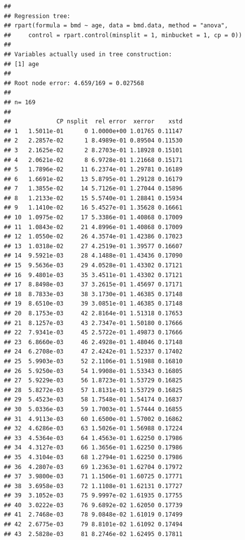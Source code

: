 \documentclass[
]{book}
\begin{document}
\begin{verbatim}
## 
## Regression tree:
## rpart(formula = bmd ~ age, data = bmd.data, method = "anova", 
##     control = rpart.control(minsplit = 1, minbucket = 1, cp = 0))
## 
## Variables actually used in tree construction:
## [1] age
## 
## Root node error: 4.659/169 = 0.027568
## 
## n= 169 
## 
##             CP nsplit  rel error  xerror    xstd
## 1   1.5011e-01      0 1.0000e+00 1.01765 0.11147
## 2   2.2857e-02      1 8.4989e-01 0.89504 0.11530
## 3   2.1625e-02      2 8.2703e-01 1.18928 0.15101
## 4   2.0621e-02      8 6.9728e-01 1.21668 0.15171
## 5   1.7896e-02     11 6.2374e-01 1.29781 0.16189
## 6   1.6691e-02     13 5.8795e-01 1.29128 0.16179
## 7   1.3855e-02     14 5.7126e-01 1.27044 0.15896
## 8   1.2133e-02     15 5.5740e-01 1.28841 0.15934
## 9   1.1410e-02     16 5.4527e-01 1.35628 0.16661
## 10  1.0975e-02     17 5.3386e-01 1.40868 0.17009
## 11  1.0843e-02     21 4.8996e-01 1.40868 0.17009
## 12  1.0550e-02     26 4.3574e-01 1.42386 0.17023
## 13  1.0318e-02     27 4.2519e-01 1.39577 0.16607
## 14  9.5921e-03     28 4.1488e-01 1.43436 0.17090
## 15  9.5636e-03     29 4.0528e-01 1.43302 0.17121
## 16  9.4801e-03     35 3.4511e-01 1.43302 0.17121
## 17  8.8498e-03     37 3.2615e-01 1.45697 0.17171
## 18  8.7833e-03     38 3.1730e-01 1.46385 0.17148
## 19  8.6510e-03     39 3.0851e-01 1.46385 0.17148
## 20  8.1753e-03     42 2.8164e-01 1.51318 0.17653
## 21  8.1257e-03     43 2.7347e-01 1.50180 0.17666
## 22  7.9341e-03     45 2.5722e-01 1.49873 0.17666
## 23  6.8660e-03     46 2.4928e-01 1.48046 0.17148
## 24  6.2708e-03     47 2.4242e-01 1.52337 0.17402
## 25  5.9903e-03     52 2.1106e-01 1.51988 0.16810
## 26  5.9250e-03     54 1.9908e-01 1.53343 0.16805
## 27  5.9229e-03     56 1.8723e-01 1.53729 0.16825
## 28  5.8272e-03     57 1.8131e-01 1.53729 0.16825
## 29  5.4523e-03     58 1.7548e-01 1.54174 0.16837
## 30  5.0336e-03     59 1.7003e-01 1.57444 0.16855
## 31  4.9113e-03     60 1.6500e-01 1.57002 0.16862
## 32  4.6286e-03     63 1.5026e-01 1.56988 0.17224
## 33  4.5364e-03     64 1.4563e-01 1.62250 0.17986
## 34  4.3127e-03     66 1.3656e-01 1.62250 0.17986
## 35  4.3104e-03     68 1.2794e-01 1.62250 0.17986
## 36  4.2807e-03     69 1.2363e-01 1.62704 0.17972
## 37  3.9800e-03     71 1.1506e-01 1.60725 0.17771
## 38  3.6958e-03     72 1.1108e-01 1.62131 0.17727
## 39  3.1052e-03     75 9.9997e-02 1.61935 0.17755
## 40  3.0222e-03     76 9.6892e-02 1.62050 0.17739
## 41  2.7468e-03     78 9.0848e-02 1.61019 0.17499
## 42  2.6775e-03     79 8.8101e-02 1.61092 0.17494
## 43  2.5828e-03     81 8.2746e-02 1.62495 0.17811

\end{verbatim}
\end{document}
